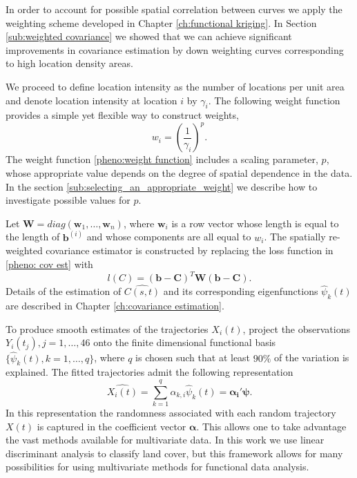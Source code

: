 In order to account for possible spatial correlation between curves we apply the weighting scheme developed in Chapter \ref{ch:functional kriging}. In Section \ref{sub:weighted covariance} we showed that we can achieve significant improvements in covariance estimation by down weighting curves corresponding to high location density areas.

We proceed to define location intensity as the number of locations per unit area and denote location intensity at location $i$ by $\gamma_i$.  The following weight function provides a simple yet flexible way to construct weights,
\begin{equation}
	w_i = \left(\frac{1}{\gamma_i}\right)^p. \label{pheno:weight function}
\end{equation}
The weight function \eqref{pheno:weight function} includes a scaling parameter, $p$, whose appropriate value depends on the degree of spatial dependence in the data. In the section \ref{sub:selecting_an_appropriate_weight} we describe how to investigate possible values for $p$.


Let $\mathbf{W} = diag(\mathbf{w}_1, \dots, \mathbf{w}_n)$, where $\mathbf{w}_i$ is a row vector whose length is equal to the length of $\mathbf{b}^{(i)}$ and whose components are all equal to $w_i$. The spatially re-weighted covariance estimator is constructed by replacing the loss function in \ref{pheno: cov est} with 
\begin{equation}
	l(C)= (\mathbf{b} - \mathbf{C})^T\mathbf{W}(\mathbf{b} - \mathbf{C}). \label{pheno:diag weighted loss function} 
\end{equation}
Details of the estimation of $\widehat{C(s,t)}$ and its corresponding eigenfunctions $\hat{\psi}_k(t)$ are described in Chapter \ref{ch:covariance estimation}. 

To produce smooth estimates of the trajectories $X_i(t)$, project the observations $Y_i(t_j), j = 1, \dots, 46$ onto the finite dimensional functional basis $\{\hat{\psi}_k(t), k = 1, \dots, q\}$, where $q$ is chosen such that at least $90\%$ of the variation is explained. The fitted trajectories admit the following representation
\begin{equation}
	\widehat{X_i(t)} = \sum_{k=1}^q\alpha_{k,i} \hat{\psi}_k(t) = \boldsymbol{\alpha_i'}\boldsymbol{\psi}.
	\label{phen:coef}
\end{equation}
In this representation the randomness associated with each random trajectory $X(t)$ is captured in the coefficient vector $\boldsymbol{\alpha}$. This allows one to take advantage the vast methods available for multivariate data. In this work we use linear discriminant analysis to classify land cover, but this framework allows for many possibilities for using multivariate methods for functional data analysis. 

